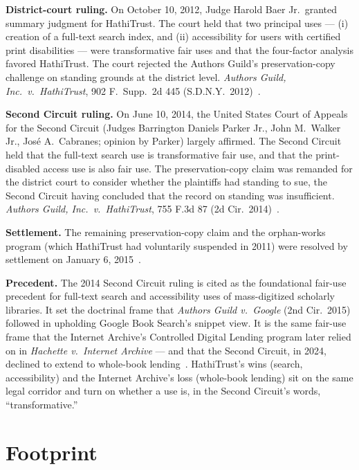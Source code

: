 \documentclass[10pt,letterpaper,twocolumn]{article}
\begin{document}
\textbf{District-court ruling.} On October 10, 2012, Judge Harold Baer Jr.~granted summary judgment for HathiTrust. The court held that two principal uses --- (i) creation of a full-text search index, and (ii) accessibility for users with certified print disabilities --- were transformative fair uses and that the four-factor analysis favored HathiTrust. The court rejected the Authors Guild's preservation-copy challenge on standing grounds at the district level. \emph{Authors Guild, Inc.~v.~HathiTrust}, 902 F.~Supp.~2d 445 (S.D.N.Y.~2012)~\citep{hathirulingdistrict}.

\textbf{Second Circuit ruling.} On June 10, 2014, the United States Court of Appeals for the Second Circuit (Judges Barrington Daniels Parker Jr., John M.~Walker Jr., José A.~Cabranes; opinion by Parker) largely affirmed. The Second Circuit held that the full-text search use is transformative fair use, and that the print-disabled access use is also fair use. The preservation-copy claim was remanded for the district court to consider whether the plaintiffs had standing to sue, the Second Circuit having concluded that the record on standing was insufficient. \emph{Authors Guild, Inc.~v.~HathiTrust}, 755 F.3d 87 (2d Cir.~2014)~\citep{hathirulingappeal,arlblog2014}.

\textbf{Settlement.} The remaining preservation-copy claim and the orphan-works program (which HathiTrust had voluntarily suspended in 2011) were resolved by settlement on January 6, 2015~\citep{authorsguildwiki}.

\textbf{Precedent.} The 2014 Second Circuit ruling is cited as the foundational fair-use precedent for full-text search and accessibility uses of mass-digitized scholarly libraries. It set the doctrinal frame that \emph{Authors Guild v.~Google} (2nd Cir.~2015) followed in upholding Google Book Search's snippet view. It is the same fair-use frame that the Internet Archive's Controlled Digital Lending program later relied on in \emph{Hachette v.~Internet Archive} --- and that the Second Circuit, in 2024, declined to extend to whole-book lending~\citep{hachettecourt2024}. HathiTrust's wins (search, accessibility) and the Internet Archive's loss (whole-book lending) sit on the same legal corridor and turn on whether a use is, in the Second Circuit's words, ``transformative.''

\section{Footprint}
\end{document}
